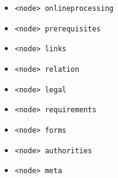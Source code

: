 \begin{itemize}
\begin{itemize}
		\item \lstinline|<node> onlineprocessing|
		\item \lstinline|<node> prerequisites|
		\item \lstinline|<node> links|
		\item \lstinline|<node> relation|
		\item \lstinline|<node> legal|
		\item \lstinline|<node> requirements|
		\item \lstinline|<node> forms|
		\item \lstinline|<node> authorities|
		\item \lstinline|<node> meta|										
	\end{itemize}
\end{itemize}














